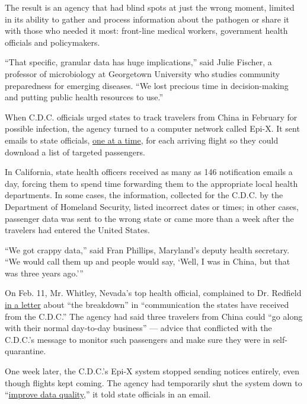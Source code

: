 The result is an agency that had blind spots at just the wrong moment,
limited in its ability to gather and process information about the
pathogen or share it with those who needed it most: front-line medical
workers, government health officials and policymakers.

``That specific, granular data has huge implications,'' said Julie
Fischer, a professor of microbiology at Georgetown University who
studies community preparedness for emerging diseases. ``We lost precious
time in decision-making and putting public health resources to use.''

When C.D.C. officials urged states to track travelers from China in
February for possible infection, the agency turned to a computer network
called Epi-X. It sent emails to state officials,
\href{https://www.documentcloud.org/documents/6933966-2020-02-Nevada-EpiX-Flight-Arrival-Emails-From-a.html}{one
at a time}, for each arriving flight so they could download a list of
targeted passengers.

In California, state health officers received as many as 146
notification emails a day, forcing them to spend time forwarding them to
the appropriate local health departments. In some cases, the
information, collected for the C.D.C. by the Department of Homeland
Security, listed incorrect dates or times; in other cases, passenger
data was sent to the wrong state or came more than a week after the
travelers had entered the United States.

``We got crappy data,'' said Fran Phillips, Maryland's deputy health
secretary. ``We would call them up and people would say, `Well, I was in
China, but that was three years ago.'''

On Feb. 11, Mr. Whitley, Nevada's top health official, complained to Dr.
Redfield
\href{https://www.documentcloud.org/documents/6933944-2020-02-11-NEVADA-LETTER-to-CDC-DIRECTOR.html}{in
a letter} about ``the breakdown'' in ``communication the states have
received from the C.D.C.'' The agency had said three travelers from
China could ``go along with their normal day-to-day business'' ---
advice that conflicted with the C.D.C.'s message to monitor such
passengers and make sure they were in self-quarantine.

One week later, the C.D.C.'s Epi-X system stopped sending notices
entirely, even though flights kept coming. The agency had temporarily
shut the system down to
``\href{https://www.documentcloud.org/documents/6933945-2020-02-28-CDC-to-States-Re-REVISIONS-to-EPI-X.html}{improve
data quality,}'' it told state officials in an email.

